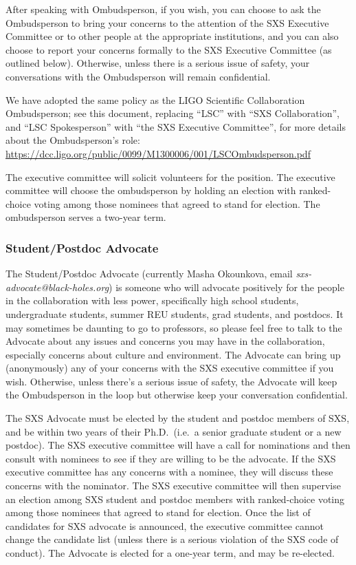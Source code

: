 After speaking with Ombudsperson, if you wish, you can choose to ask
the Ombudsperson to bring your concerns to the attention of the SXS
Executive Committee or to other people at the appropriate
institutions, and you can also choose to report your concerns formally
to the SXS Executive Committee (as outlined below). Otherwise, unless
there is a serious issue of safety, your conversations with the
Ombudsperson will remain confidential.

We have adopted the same policy as the LIGO Scientific Collaboration
Ombudsperson; see this document, replacing “LSC” with “SXS
Collaboration”, and “LSC Spokesperson” with “the SXS Executive
Committee”, for more details about the Ombudsperson’s role:
\url{https://dcc.ligo.org/public/0099/M1300006/001/LSCOmbudsperson.pdf}

The executive committee will solicit volunteers for the
position.  The executive committee will choose the ombudsperson by
holding an election with ranked-choice voting among those nominees
that agreed to stand for election.  The ombudsperson serves a
two-year term.

\subsubsection{Student/Postdoc Advocate}
\label{sec:advocate}
The Student/Postdoc Advocate (currently Masha Okounkova, email
\emph{sxs-advocate@black-holes.org}) is someone who will advocate
positively for the people in the collaboration with less power,
specifically high school students, undergraduate students, summer REU
students, grad students, and postdocs. It may sometimes be daunting to
go to professors, so please feel free to talk to the Advocate about
any issues and concerns you may have in the collaboration, especially
concerns about culture and environment. The Advocate can bring up
(anonymously) any of your concerns with the SXS executive committee if
you wish. Otherwise, unless there’s a serious issue of safety, the
Advocate will keep the Ombudsperson in the loop but otherwise keep
your conversation confidential.


The SXS Advocate must be elected by the student and postdoc members of
SXS, and be within two years of their Ph.D.~(i.e.~a senior graduate
student or a new postdoc).  The SXS executive committee will have a
call for nominations and then consult with nominees to see if they are
willing to be the advocate.  If the SXS executive committee has any
concerns with a nominee, they will discuss these concerns with the
nominator.  The SXS executive committee will then supervise an
election among SXS student and postdoc members with ranked-choice
voting among those nominees that agreed to stand for election.  Once
the list of candidates for SXS advocate is announced, the executive
committee cannot change the candidate list (unless there is a serious
violation of the SXS code of conduct).  The Advocate is elected for a
one-year term, and may be re-elected.

